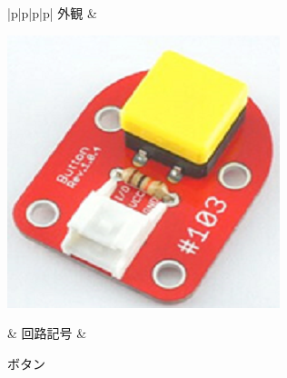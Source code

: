 \begin{figure}[H]
	\begin{tabular}{|p{\colH}|p{\colI}|p{\colH}|p{\colI}|} \hline
	外観 & 
	\begin{minipage}[t]{\linewidth}
    \smallskip
      \centering
      \includegraphics[width=\linewidth]{images/chap05/text05-img028.png}
      \caption{ボタン}
      \smallskip
    \end{minipage} &
    回路記号 & 
    \begin{minipage}[t]{\linewidth}
    \smallskip
      \centering

\end{minipage}
\end{tabular}
\end{figure}
